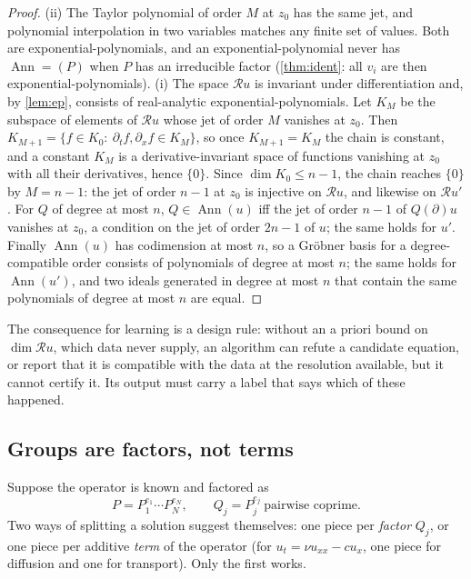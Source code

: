 \documentclass[11pt]{article}
\theoremstyle{plain}
\theoremstyle{definition}
\theoremstyle{remark}
\newcommand{\ring}{\mathcal{R}}            %
\DeclareMathOperator{\Ann}{Ann}             %
\begin{document}
\begin{proof}
(ii) The Taylor polynomial of order $M$ at $z_0$ has the same jet, and polynomial interpolation in two variables
matches any finite set of values. Both are exponential-polynomials, and an exponential-polynomial never has
$\Ann=(P)$ when $P$ has an irreducible factor (\cref{thm:ident}: all $v_i$ are then exponential-polynomials).
(i) The space $\ring u$ is invariant under differentiation and, by \cref{lem:ep}, consists of real-analytic
exponential-polynomials. Let $K_M$ be the subspace of elements of $\ring u$ whose jet of order $M$ vanishes at $z_0$.
Then $K_{M+1}=\{f\in K_0:\ \partial_tf,\partial_xf\in K_M\}$, so once $K_{M+1}=K_M$ the chain is constant, and a
constant $K_M$ is a derivative-invariant space of functions vanishing at $z_0$ with all their derivatives, hence
$\{0\}$. Since $\dim K_0\le n-1$, the chain reaches $\{0\}$ by $M=n-1$: the jet of order $n-1$ at $z_0$ is injective
on $\ring u$, and likewise on $\ring u'$. For $Q$ of degree at most $n$, $Q\in\Ann(u)$ iff the jet of order
$n-1$ of $Q(\partial)u$ vanishes at $z_0$, a condition on the jet of order $2n-1$ of $u$; the same holds for $u'$.
Finally $\Ann(u)$ has codimension at most $n$, so a Gr\"obner basis for a degree-compatible order consists of
polynomials of degree at most $n$; the same holds for $\Ann(u')$, and two ideals generated in degree at most $n$
that contain the same polynomials of degree at most $n$ are equal.
\end{proof}

The consequence for learning is a design rule: without an a priori bound on $\dim\ring u$, which data never
supply, an algorithm can refute a candidate equation, or report that it is compatible with the data at
the resolution available, but it cannot certify it. Its output must carry a label that says which of these
happened.



\subsection{Groups are factors, not terms}\label{sec:factor}
Suppose the operator is known and factored as
\begin{equation}\label{eq:factored}
  P=P_1^{e_1}\cdots P_N^{e_N},\qquad Q_j=P_j^{e_j}\ \text{pairwise coprime}.
\end{equation}
Two ways of splitting a solution suggest themselves: one piece per \emph{factor} $Q_j$, or one piece
per additive \emph{term} of the operator (for $u_t=\nu u_{xx}-cu_x$, one piece for diffusion and one
for transport). Only the first works.
\end{document}
